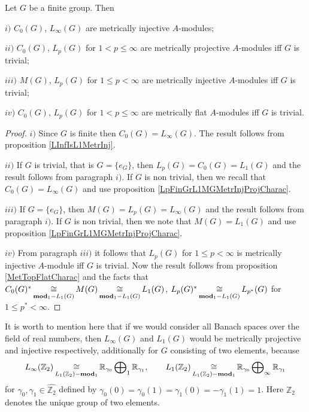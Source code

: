 \begin{proposition}\label{StdModFinGrL1MGMetrInjProjFlatCharac} Let $G$ be a finite group. Then

$i)$ $C_0(G)$, $L_\infty(G)$ are metrically injective $A$-modules;

$ii)$ $C_0(G)$, $L_p(G)$ for $1<p\leq\infty$ are metrically projective $A$-modules iff $G$ is trivial;

$iii)$ $M(G)$, $L_p(G)$ for $1\leq p<\infty$ are metrically injective  $A$-modules iff $G$ is trivial;

$iv)$ $C_0(G)$, $L_p(G)$ for $1<p\leq\infty$ are metrically flat $A$-modules iff $G$ is trivial.
\end{proposition}
\begin{proof}
$i)$ Since $G$ is finite then $C_0(G)=L_\infty(G)$. The result follows from proposition \ref{LInfIsL1MetrInj}.

$ii)$ If $G$ is trivial, that is $G=\{e_G\}$, then $L_p(G)=C_0(G)=L_1(G)$ and the result follows from paragraph $i)$. If $G$ is non trivial, then we recall that $C_0(G)=L_\infty(G)$ and use proposition \ref{LpFinGrL1MGMetrInjProjCharac}.

$iii)$ If $G=\{e_G\}$, then $M(G)=L_p(G)=L_\infty(G)$ and the result follows from paragraph $i)$. If $G$ is non trivial, then we note that $M(G)=L_1(G)$ and use proposition \ref{LpFinGrL1MGMetrInjProjCharac}.

$iv)$ From paragraph $iii)$ it follows that $L_p(G)$ for $1\leq p<\infty$ is metrically injective $A$-module iff $G$ is trivial. Now the result follows from proposition \ref{MetTopFlatCharac} and the facts that $C_0(G)^*\mathop{\mathbin{\cong}}\limits_{\mathbf{mod}_1-L_1(G)}M(G)\mathop{\mathbin{\cong}}\limits_{\mathbf{mod}_1-L_1(G)}L_1(G)$, $L_p(G)^*\mathop{\mathbin{\cong}}\limits_{\mathbf{mod}_1-L_1(G)}L_{p^*}(G)$ for $1\leq p^*<\infty$.
\end{proof}

It is worth to mention here that if we would consider all Banach spaces over the field of real numbers, then $L_\infty(G)$ and $L_1(G)$ would be metrically projective and injective respectively,  additionally for $G$ consisting of two elements, because
$$
L_\infty(\mathbb{Z}_2)\mathop{\mathbin{\cong}}\limits_{L_1(\mathbb{Z}_2)-\mathbf{mod}_1}\mathbb{R}_{\gamma_0}\bigoplus\nolimits_1\mathbb{R}_{\gamma_1},
\qquad
L_1(\mathbb{Z}_2)\mathop{\mathbin{\cong}}\limits_{L_1(\mathbb{Z}_2)-\mathbf{mod}_1}\mathbb{R}_{\gamma_0}\bigoplus\nolimits_\infty\mathbb{R}_{\gamma_1}
$$
for $\gamma_0,\gamma_1\in\widehat{\mathbb{Z}_2}$ defined by $\gamma_0(0)=\gamma_0(1)=\gamma_1(0)=-\gamma_1(1)=1$. Here $\mathbb{Z}_2$ denotes the unique group of two elements.

